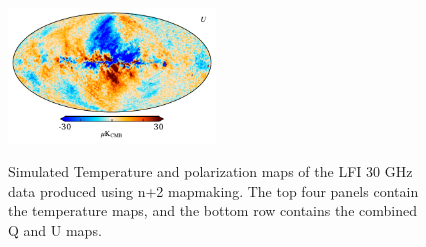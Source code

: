 \documentclass{aa}
\begin{document}
\begin{figure}
  \includegraphics[width=0.49\textwidth]{figs/sim_U.pdf}\\
  \caption{Simulated Temperature and polarization maps of the LFI 30 GHz data produced using n+2 mapmaking. The top four panels contain the temperature maps, and the bottom row contains the combined Q and U maps.}
  \label{fig:sim}
\end{figure}
\end{document}
